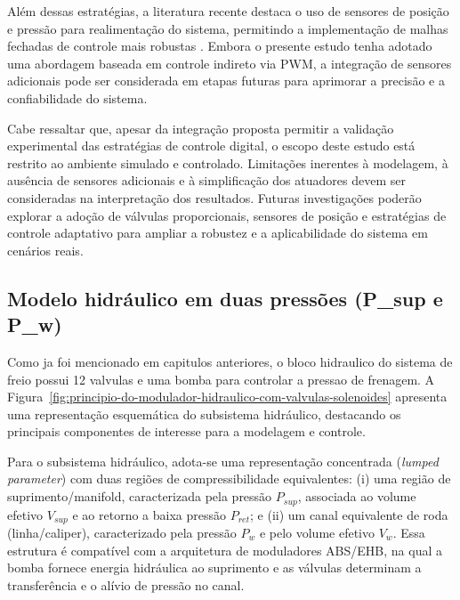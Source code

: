 Além dessas estratégias, a literatura recente destaca o uso de sensores de posição e pressão para realimentação do sistema, permitindo a implementação de malhas fechadas de controle mais robustas \cite{HouhuaJingShihao2023}. Embora o presente estudo tenha adotado uma abordagem baseada em controle indireto via PWM, a integração de sensores adicionais pode ser considerada em etapas futuras para aprimorar a precisão e a confiabilidade do sistema.

Cabe ressaltar que, apesar da integração proposta permitir a validação experimental das estratégias de controle digital, o escopo deste estudo está restrito ao ambiente simulado e controlado. Limitações inerentes à modelagem, à ausência de sensores adicionais e à simplificação dos atuadores devem ser consideradas na interpretação dos resultados. Futuras investigações poderão explorar a adoção de válvulas proporcionais, sensores de posição e estratégias de controle adaptativo para ampliar a robustez e a aplicabilidade do sistema em cenários reais.

\subsection{Modelo hidráulico em duas pressões (P\_sup e P\_w)}
\label{sec:controle-modelo-hidraulico-2p}
Como ja foi mencionado em capitulos anteriores, o bloco hidraulico do sistema de freio possui 12 valvulas e uma bomba para controlar a pressao de frenagem. A Figura~\ref{fig:principio-do-modulador-hidraulico-com-valvulas-solenoides} apresenta uma representação esquemática do subsistema hidráulico, destacando os principais componentes de interesse para a modelagem e controle.

Para o subsistema hidráulico, adota-se uma representação concentrada (\textit{lumped parameter}) com duas regiões de compressibilidade equivalentes: (i) uma região de suprimento/manifold, caracterizada pela pressão $P_{sup}$, associada ao volume efetivo $V_{sup}$ e ao retorno a baixa pressão $P_{ret}$; e (ii) um canal equivalente de roda (linha/caliper), caracterizado pela pressão $P_w$ e pelo volume efetivo $V_w$. Essa estrutura é compatível com a arquitetura de moduladores ABS/EHB, na qual a bomba fornece energia hidráulica ao suprimento e as válvulas determinam a transferência e o alívio de pressão no canal.

